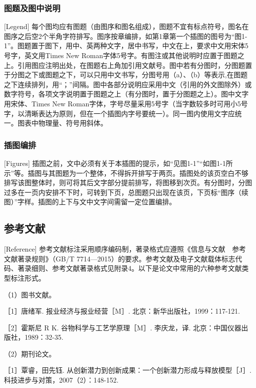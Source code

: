 \addtocounter{subsection}{1}
\subsubsection{图题及图中说明}[Legend]
每个图均应有图题（由图序和图名组成），图题不宜有标点符号，图名在图序之后空2个半角字符排写。图序按章编排，如第1章第一个插图的图号为“图1-1”。图题置于图下，用中、英两种文字，居中书写，中文在上，要求中文用宋体5号字，英文用Times New Roman字体5号字。有图注或其他说明时应置于图题之上。引用图应注明出处，在图题右上角加引用文献号。图中若有分图时，分图题置于分图之下或图题之下，可以只用中文书写，分图号用（a）、（b）等表示,在图题之下连续排列，用“；”间隔。图中各部分说明应采用中文（引用的外文图除外）或数字符号，各项文字说明置于图题之上（有分图时，置于分图题之上）。图中文字用宋体、Times New Roman字体，字号尽量采用5号字（当字数较多时可用小5号字，以清晰表达为原则，但在一个插图内字号要统一）。同一图内使用文字应统一。图表中物理量、符号用斜体。

\subsubsection{插图编排}[Figures]
插图之前，文中必须有关于本插图的提示，如“见图1-1”“如图1-1所示”等。插图与其图题为一个整体，不得拆开排写于两页。插图处的该页空白不够排写该图整体时，则可将其后文字部分提前排写，将图移到次页。有分图时，分图过多在一页内安排不下时，可转到下页，总图题只出现在该页，下页标“图序（续图）”字样。插图的上下与文中文字间需留一定位置编排。

\subsection{参考文献}[Reference]
参考文献标注采用顺序编码制，著录格式应遵照《信息与文献　参考文献著录规则》（GB/T 7714—2015）的要求。参考文献及电子文献载体标志代码、著录细则、参考文献著录格式见附录4。以下是论文中常用的六种参考文献类型标注形式。

（1）图书文献。

［1］唐绪军. 报业经济与报业经营［M］. 北京：新华出版社，1999：117-121.

［2］霍斯尼 R K. 谷物科学与工艺学原理［M］. 李庆龙，译. 北京：中国仪器出版社，1989：32-35.

（2）期刊论文。

［1］覃睿，田先钰. 从创新潜力到创新成果：一个创新潜力形成与释放模型［J］. 科技进步与对策，2007（2）：148-152.


